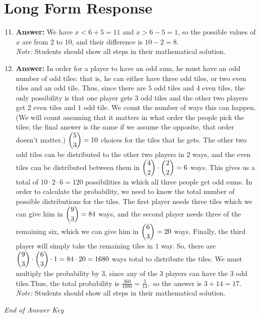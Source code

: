 \documentclass[12pt]{article}
\begin{document}
\section*{Long Form Response}
\begin{enumerate}[label=\arabic*.]
\setcounter{enumi}{10}
\item \textbf{Answer:} We have $x<6+5=11$ and $x>6-5=1$, so the possible values of $x$ are from $2$ to $10$, and their difference is $10-2 = \boxed{8}$.
\\ \textit{Note:} Students should show all steps in their mathematical solution.
\item \textbf{Answer:} In order for a player to have an odd sum, he must have an odd number of odd tiles: that is, he can either have three odd tiles, or two even tiles and an odd tile. Thus, since there are $5$ odd tiles and $4$ even tiles, the only possibility is that one player gets $3$ odd tiles and the other two players get $2$ even tiles and $1$ odd tile. We count the number of ways this can happen. (We will count assuming that it matters in what order the people pick the tiles; the final answer is the same if we assume the opposite, that order doesn't matter.) $\dbinom{5}{3} = 10$ choices for the tiles that he gets. The other two odd tiles can be distributed to the other two players in $2$ ways, and the even tiles can be distributed between them in $\dbinom{4}{2} \cdot \dbinom{2}{2} = 6$ ways. This gives us a total of $10 \cdot 2 \cdot 6 = 120$ possibilities in which all three people get odd sums. In order to calculate the probability, we need to know the total number of possible distributions for the tiles. The first player needs three tiles which we can give him in $\dbinom{9}{3} = 84$ ways, and the second player needs three of the remaining six, which we can give him in $\dbinom{6}{3} = 20$ ways. Finally, the third player will simply take the remaining tiles in $1$ way. So, there are $\dbinom{9}{3} \cdot \dbinom{6}{3} \cdot 1 = 84 \cdot 20 = 1680$ ways total to distribute the tiles. We must multiply the probability by 3, since any of the 3 players can have the 3 odd tiles.Thus, the total probability is $\frac{360}{1680} = \frac{3}{14},$ so the answer is $3 + 14 = \boxed{17}$.
\\ \textit{Note:} Students should show all steps in their mathematical solution.
\end{enumerate}

\vfill
\noindent\textit{End of Answer Key}
\end{document}

